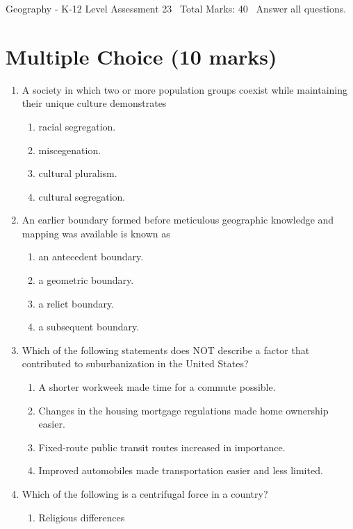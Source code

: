 \documentclass[12pt]{article}
\begin{document}
\begin{center}
Geography - K-12 Level Assessment 23 \
Total Marks: 40 \
Answer all questions.
\end{center}

\section*{Multiple Choice (10 marks)}
\begin{enumerate}[label=\arabic*.]
\item A society in which two or more population groups coexist while maintaining their unique culture demonstrates
\begin{enumerate}[label=(\alph*)]
    \item racial segregation.
    \item miscegenation.
    \item cultural pluralism.
    \item cultural segregation.
\end{enumerate}
\item An earlier boundary formed before meticulous geographic knowledge and mapping was available is known as
\begin{enumerate}[label=(\alph*)]
    \item an antecedent boundary.
    \item a geometric boundary.
    \item a relict boundary.
    \item a subsequent boundary.
\end{enumerate}
\item Which of the following statements does NOT describe a factor that contributed to suburbanization in the United States?
\begin{enumerate}[label=(\alph*)]
    \item A shorter workweek made time for a commute possible.
    \item Changes in the housing mortgage regulations made home ownership easier.
    \item Fixed-route public transit routes increased in importance.
    \item Improved automobiles made transportation easier and less limited.
\end{enumerate}
\item Which of the following is a centrifugal force in a country?
\begin{enumerate}[label=(\alph*)]
    \item Religious differences

\end{enumerate}
\end{enumerate}
\end{document}
